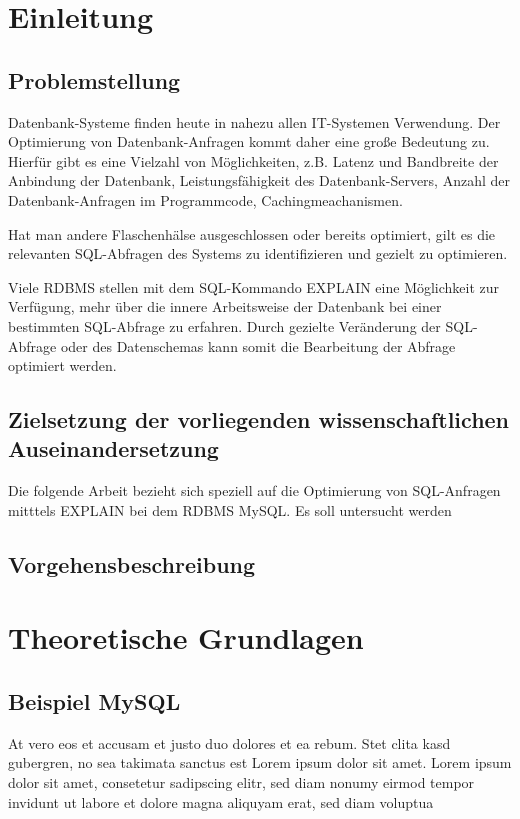 \chapter{Einleitung}
\section{Problemstellung}
Datenbank-Systeme finden heute in nahezu allen IT-Systemen Verwendung.
Der Optimierung von Datenbank-Anfragen kommt daher eine große Bedeutung zu.
Hierfür gibt es eine Vielzahl von Möglichkeiten, z.B. Latenz und Bandbreite der Anbindung der Datenbank, Leistungsfähigkeit des Datenbank-Servers, Anzahl der Datenbank-Anfragen im Programmcode, Cachingmeachanismen.

Hat man andere Flaschenhälse ausgeschlossen oder bereits optimiert,  gilt es die relevanten SQL-Abfragen des Systems zu identifizieren und gezielt zu optimieren.

Viele RDBMS stellen mit dem SQL-Kommando EXPLAIN eine Möglichkeit zur Verfügung, mehr über die innere Arbeitsweise der Datenbank bei einer bestimmten SQL-Abfrage zu erfahren.
Durch gezielte Veränderung der SQL-Abfrage oder des Datenschemas kann somit die Bearbeitung der Abfrage optimiert werden.

\section{Zielsetzung der vorliegenden  wissenschaftlichen  Auseinandersetzung}
Die folgende Arbeit bezieht sich speziell auf die Optimierung von SQL-Anfragen mitttels EXPLAIN bei dem RDBMS MySQL.
Es soll untersucht werden 

\section{Vorgehensbeschreibung}

\chapter{Theoretische Grundlagen}


\section{Beispiel MySQL}
 At vero eos et
  accusam et justo duo dolores et ea rebum. Stet clita kasd
  gubergren, no sea takimata sanctus est Lorem ipsum dolor sit
  amet. Lorem ipsum dolor sit amet, consetetur sadipscing elitr,
  sed diam nonumy eirmod tempor invidunt ut labore et dolore
  magna aliquyam erat, sed diam voluptua

